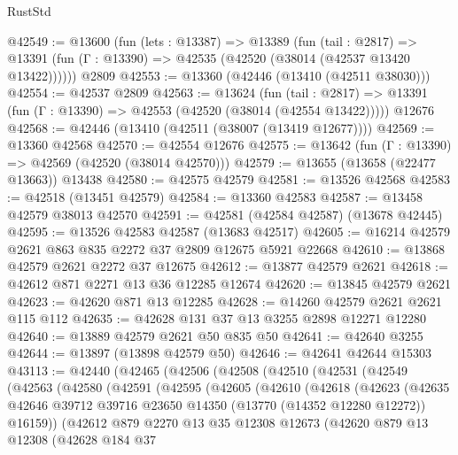 \begin{lexlean}{RustStd}
\begin{coremodule}
@42549 := @13600
    (fun (lets : @13387) =>
    @13389
      (fun (tail : @2817) =>
      @13391 (fun (Γ : @13390) => @42535 (@42520 (@38014 (@42537 @13420 @13422))))))
    @2809
@42553 := @13360 (@42446 (@13410 (@42511 @38030)))
@42554 := @42537 @2809
@42563 := @13624
    (fun (tail : @2817) => @13391 (fun (Γ : @13390) => @42553 (@42520 (@38014 (@42554 @13422)))))
    @12676
@42568 := @42446 (@13410 (@42511 (@38007 (@13419 @12677))))
@42569 := @13360 @42568
@42570 := @42554 @12676
@42575 := @13642 (fun (Γ : @13390) => @42569 (@42520 (@38014 @42570)))
@42579 := @13655 (@13658 (@22477 @13663)) @13438
@42580 := @42575 @42579
@42581 := @13526 @42568
@42583 := @42518 (@13451 @42579)
@42584 := @13360 @42583
@42587 := @13458 @42579 @38013 @42570
@42591 := @42581 (@42584 @42587) (@13678 @42445)
@42595 := @13526 @42583 @42587 (@13683 @42517)
@42605 := @16214 @42579 @2621 @863 @835 @2272 @37 @2809 @12675 @5921 @22668
@42610 := @13868 @42579 @2621 @2272 @37 @12675
@42612 := @13877 @42579 @2621
@42618 := @42612 @871 @2271 @13 @36 @12285 @12674
@42620 := @13845 @42579 @2621
@42623 := @42620 @871 @13 @12285
@42628 := @14260 @42579 @2621 @2621 @115 @112
@42635 := @42628 @131 @37 @13 @3255 @2898 @12271 @12280
@42640 := @13889 @42579 @2621 @50 @835 @50
@42641 := @42640 @3255
@42644 := @13897 (@13898 @42579 @50)
@42646 := @42641 @42644 @15303
@43113 := @42440
    (@42465
      (@42506
        (@42508
          (@42510
            (@42531
              (@42549
                (@42563
                  (@42580
                    (@42591
                      (@42595
                        (@42605
                          (@42610
                            (@42618
                              (@42623
                                (@42635
                                  @42646
                                  @39712
                                  @39716
                                  @23650
                                  @14350
                                  (@13770 (@14352 @12280 @12272))
                                  @16159))
                              (@42612
                                @879
                                @2270
                                @13
                                @35
                                @12308
                                @12673
                                (@42620
                                  @879
                                  @13
                                  @12308
                                  (@42628
                                    @184
                                    @37

\end{coremodule}
\end{lexlean}
